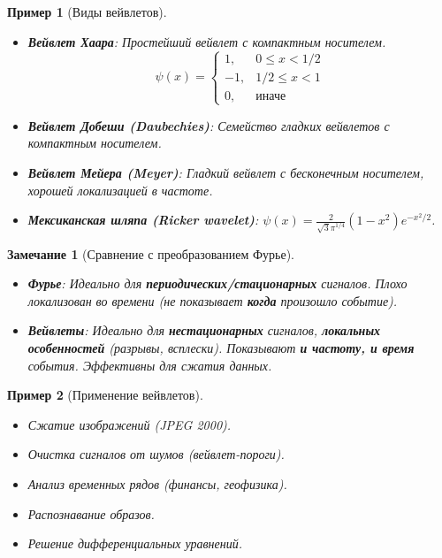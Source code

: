 \documentclass[a4paper, 12pt]{article}
\newtheorem{example}{Пример}
\newtheorem{remark}{Замечание}
\newcommand{\1}{\mathbf{1}}
\begin{document}
\begin{example}[Виды вейвлетов]
    \hfill
    \begin{itemize}
        \item \textbf{Вейвлет Хаара}: Простейший вейвлет с компактным носителем.
        \[
        \psi(x) = \begin{cases} 
        1, & 0 \leq x < 1/2 \\
        -1, & 1/2 \leq x < 1 \\
        0, & \text{иначе}
        \end{cases}
        \]
        \item \textbf{Вейвлет Добеши (Daubechies)}: Семейство гладких вейвлетов с компактным носителем.
        \item \textbf{Вейвлет Мейера (Meyer)}: Гладкий вейвлет с бесконечным носителем, хорошей локализацией в частоте.
        \item \textbf{Мексиканская шляпа (Ricker wavelet)}: $\psi(x) = \frac{2}{\sqrt{3}\pi^{1/4}} (1 - x^2) e^{-x^2/2}$.
    \end{itemize}
\end{example}

\begin{remark}[Сравнение с преобразованием Фурье]
    \hfill
    \begin{itemize}
        \item \textbf{Фурье}: Идеально для \textbf{периодических/стационарных} сигналов. Плохо локализован во времени (не показывает \textbf{когда} произошло событие).
        \item \textbf{Вейвлеты}: Идеально для \textbf{нестационарных} сигналов, \textbf{локальных особенностей} (разрывы, всплески). Показывают \textbf{и частоту, и время} события. Эффективны для сжатия данных.
    \end{itemize}
\end{remark}

\begin{example}[Применение вейвлетов]
    \hfill
    \begin{itemize}
        \item Сжатие изображений (JPEG 2000).
        \item Очистка сигналов от шумов (вейвлет-пороги).
        \item Анализ временных рядов (финансы, геофизика).
        \item Распознавание образов.
        \item Решение дифференциальных уравнений.
    \end{itemize}
\end{example}
\end{document}
